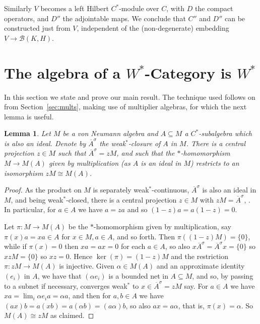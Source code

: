 \documentclass[a4paper,11pt]{article}
\theoremstyle{plain}
\newtheorem{lemma}[proposition]{Lemma}
\theoremstyle{remark}
\newcommand{\mc}[1]{\mathcal{#1}}
\begin{document}
Similarly $V$ becomes a left Hilbert $C^*$-module over $C$, with $D$ the compact operators, and $D''$ the adjointable maps.  We conclude that $C''$ and $D''$ can be constructed just from $V$, independent of the (non-degenerate) embedding $V \to \mc B(K,H)$.



\section{The algebra of a \texorpdfstring{$W^*$}{WStar}-Category is \texorpdfstring{$W^*$}{WStar}}\label{sec:main}

In this section we state and prove our main result.  The technique used follows on from Section~\ref{sec:mults}, making use of multiplier algebras, for which the next lemma is useful.

\begin{lemma}
Let $M$ be a von Neumann algebra and $A \subseteq M$ a $C^*$-subalgebra which is also an ideal.  Denote by $\overline{A}^\sigma$ the weak$^*$-closure of $A$ in $M$.  There is a central projection $z\in M$ such that $\overline{A}^\sigma = zM$, and such that the $*$-homomorphism $M \to M(A)$ given by multiplication (as $A$ is an ideal in $M$) restricts to an isomorphism $zM \cong M(A)$.
\end{lemma}
\begin{proof}
As the product on $M$ is separately weak$^*$-continuous, $\overline{A}^\sigma$ is also an ideal in $M$, and being weak$^*$-closed, there is a central projection $z\in M$ with $zM = \overline{A}^\sigma$, \cite[Proposition~II.3.12]{TakesakiI}.  In particular, for $a\in A$ we have $a=za$ and so $(1-z)a = a(1-z) = 0$.

Let $\pi \colon M \to M(A)$ be the $*$-homomorphism given by multiplication, say $\pi(x)a = xa\in A$ for $x\in M, a\in A$, and so forth.  Then $\pi((1-z)M) = \{0\}$, while if $\pi(x)=0$ then $xa=ax=0$ for each $a\in A$, so also $x\overline{A}^\sigma = \overline{A}^\sigma x = \{0\}$ so $xzM = \{0\}$ so $xz=0$.  Hence $\ker(\pi) = (1-z)M$ and the restriction $\pi \colon zM \to M(A)$ is injective.  Given $\alpha\in M(A)$ and an approximate identity $(e_i)$ in $A$, we have that $(\alpha e_i)$ is a bounded net in $A \subseteq M$, and so, by passing to a subnet if necessary, converges weak$^*$ to $x\in \overline{A}^\sigma = zM$ say.  For $a\in A$ we have $xa = \lim_i \alpha e_i a = \alpha a$, and then for $a,b\in A$ we have $(ax)b = a(xb) = a(\alpha b) = (a\alpha)b$, so also $ax = a\alpha$, that is, $\pi(x) = \alpha$.  So $M(A) \cong zM$ as claimed.
\end{proof}
\end{document}

